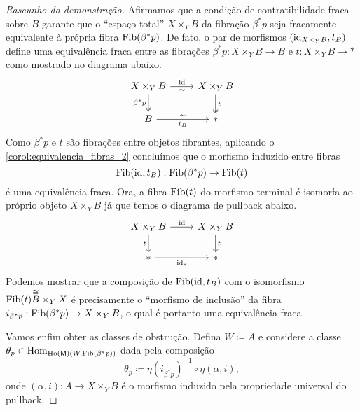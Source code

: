 \begin{proof}[Rascunho da demonstração]
  Afirmamos que a condição de contratibilidade fraca sobre $B$ garante que o ``espaço total'' $X \times_{Y} B$ da fibração $\beta^{*}p$ seja fracamente equivalente à própria fibra $\mathrm{Fib}(\beta^{*}p)$.
  De fato, o par de morfismos $(\mathrm{id}_{X \times_{Y} B},t_{B})$ define uma equivalência fraca entre as fibrações $\beta^{*}p: X \times_{Y} B \to B$ e $t: X \times_{Y} B \to *$ como mostrado no diagrama abaixo.
  \begin{displaymath}
    \begin{tikzcd}
      X \times_{Y} B
      \arrow[d, two heads, "\beta^{*}p" swap]
      \arrow[r, "\id", "\sim" {swap}]
      & X \times_{Y} B
      \arrow[d, two heads, "t"]
      \\ B
      \arrow[r, "t_{B}" {swap}, "\sim"]
      & *
    \end{tikzcd}
  \end{displaymath}
  Como $\beta^{*}p$ e $t$ são fibrações entre objetos fibrantes, aplicando o \cref{corol:equivalencia_fibras_2} concluímos que o morfismo induzido entre fibras
  \begin{displaymath}
    \mathrm{Fib}(\mathrm{id},t_{B}): \mathrm{Fib}(\beta^{*}p) \to \mathrm{Fib}(t)
  \end{displaymath}
  é uma equivalência fraca.
  Ora, a fibra $\mathrm{Fib}(t)$ do morfismo terminal é isomorfa ao próprio objeto $X \times_{Y} B$ já que temos o diagrama de pullback abaixo.
  \begin{displaymath}
    \begin{tikzcd}
      X \times_{Y} B
      \arrow[d, "t" swap]
      \arrow[r, "\id"]
      & X \times_{Y} B
      \arrow[d, "t"]
      \\ *
      \arrow[r, "\id_{*}" swap]
      & *
    \end{tikzcd}
  \end{displaymath}
  Podemos mostrar que a composição de $\mathrm{Fib}(\mathrm{id},t_{B})$ com o isomorfismo $\mathrm{Fib}(t) \overset{\cong} B \times_{Y} X$ é precisamente o ``morfismo de inclusão'' da fibra $i_{\beta^{*}p}: \mathrm{Fib}(\beta^{*}p) \to X \times_{Y} B$, o qual é portanto uma equivalência fraca.

  Vamos enfim obter as classes de obstrução.
  Defina $W \coloneqq A$ e considere a classe $\theta_{p} \in \mathrm{Hom}_{\mathrm{Ho}(\mathsf{M})(W,\mathrm{Fib}(\beta^{*}p))}$ dada pela composição
  \begin{displaymath}
    \theta_{p} \coloneqq \eta(i_{\beta^{*}p})^{-1} \circ \eta(\alpha,i),
  \end{displaymath}
  onde $(\alpha,i): A \to X \times_{Y} B$ é o morfismo induzido pela propriedade universal do pullback.


\end{proof}
